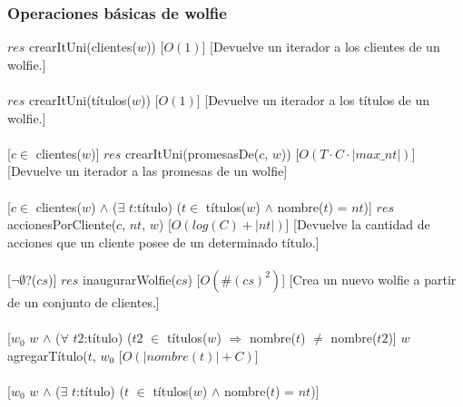   \subsubsection{Operaciones b\'asicas de wolfie}
  {$res$ \igobs crearItUni(clientes($w$))}
  [$O(1)$]
  [Devuelve un iterador a los clientes de un wolfie.]\\\\
  {$res$ \igobs crearItUni(t\'itulos($w$))}%
  [$O(1)$]
  [Devuelve un iterador a los t\'itulos de un wolfie.]\\\\
  [$c \in$ clientes($w$)]
  {$res$ \igobs crearItUni(promesasDe($c$, $w$))}%
  [$O(T \cdotp C \cdotp |max\_nt|)$]
  [Devuelve un iterador a las promesas de un wolfie]\\\\
  [$c \in$ clientes($w$) $\land$ ($\exists$ $t$:t\'itulo) ($t \in$ t\'itulos($w$) $\land$ nombre($t$) = $nt$)]
  {$res$ \igobs accionesPorCliente($c$, $nt$, $w$)}%
  [$O(log(C)+|nt|)$]
  [Devuelve la cantidad de acciones que un cliente posee de un determinado t\'itulo.]\\\\
  [$\neg\emptyset$?($cs$)]
  {$res$ \igobs inaugurarWolfie($cs$)}
  [$O(\#(cs)^2)$]
  [Crea un nuevo wolfie a partir de un conjunto de clientes.]\\\\  %
  [$w_{0}$ \igobs $w$ $\land$ ($\forall$ $t2$:t\'itulo) ($t2$ $\in$ t\'itulos($w$) $\Rightarrow$ nombre($t$) $\neq$ nombre($t2$)]
  {$w$ \igobs agregarT\'itulo($t$, $w_{0}$}%
  [$O(|nombre(t)|+C)$]\\\\
  [$w_{0}$ \igobs $w$ $\land$ ($\exists$ $t$:t\'itulo) ($t$ $\in$ t\'itulos($w$) $\land$ nombre($t$) = $nt$)]
